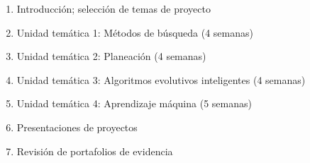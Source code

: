 \begin{enumerate}[itemsep=-3pt]
\item{Introducci\'{o}n; selecci\'{o}n de temas de proyecto}
\item{Unidad tem\'{a}tica 1: M\'{e}todos de b\'{u}squeda (4 semanas)}
\item{Unidad tem\'{a}tica 2: Planeaci\'{o}n (4 semanas)}
\item{Unidad tem\'{a}tica 3: Algoritmos evolutivos inteligentes (4 semanas)}
\item{Unidad tem\'{a}tica 4: Aprendizaje m\'{a}quina (5 semanas)}
\item{Presentaciones de proyectos}
\item{Revisi\'{o}n de portafolios de evidencia}
\end{enumerate}
